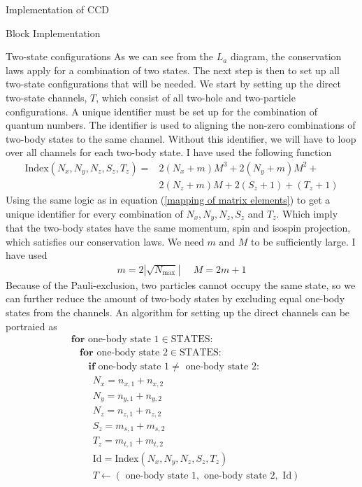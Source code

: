 \documentclass[twoside,english]{uiofysmaster}
\begin{document}
\begin{chapter}{Implementation of CCD}
\begin{section}{Block Implementation}
		\begin{subsection}{Two-state configurations}
			As we can see from the $L_a$ diagram, the conservation laws apply for a combination of two states. The next step is then to set up all two-state configurations that will be needed. We start by setting up the direct two-state channels, $T$, which consist of all two-hole and two-particle configurations. A unique identifier must be set up for the combination of quantum numbers. The identifier is used to aligning the non-zero combinations of two-body states to the same channel. Without this identifier, we will have to loop over all channels for each two-body state. I have used the following function 
			\begin{align}
				\text{Index}(N_x,N_y,N_z,S_z,T_z) = &2(N_x + m)M^3 + 2(N_y+m)M^2 + \\ & 2(N_z+m)M + 2(S_z+1) + (T_z+1)
			\end{align}
			Using the same logic as in equation (\ref{mapping of matrix elements}) to get a unique identifier for every combination of $N_x,N_y,N_z,S_z$ and $T_z$. Which imply that the two-body states have the same momentum, spin and isospin projection, which satisfies our conservation laws. We need $m$ and $M$ to be sufficiently large. I have used
			\begin{align}
				m = 2|\sqrt{N_{\text{max}}}| \:\:\:\:\:\: M = 2m +1
			\end{align}
			Because of the Pauli-exclusion, two particles cannot occupy the same state, so we can further reduce the amount of two-body states by excluding equal one-body states from the channels. An algorithm for setting up the direct channels can be portraied as
			\begin{align*}
				&\mathbf{for } \text{ one-body state 1} \in \text{STATES}: \\
				&\:\:\:\: \mathbf{for } \text{ one-body state 2} \in \text{STATES}: \\
				&\:\:\:\:\:\:\:\: \mathbf{if} \text{ one-body state 1} \neq \text{ one-body state 2}: \\
				&\:\:\:\:\:\:\:\:\:\: N_x = n_{x,1} + n_{x,2} \\
				&\:\:\:\:\:\:\:\:\:\: N_y = n_{y,1} + n_{y,2} \\
				&\:\:\:\:\:\:\:\:\:\: N_z = n_{z,1} + n_{z,2} \\
 				&\:\:\:\:\:\:\:\:\:\: S_z = m_{s,1} + m_{s,2} \\
				&\:\:\:\:\:\:\:\:\:\: T_z = m_{t,1} + m_{t,2} \\
				&\:\:\:\:\:\:\:\:\:\: \text{Id} = \text{Index}(N_x,N_y,N_z,S_z,T_z) \\
				&\:\:\:\:\:\:\:\:\:\: T \leftarrow (\text{ one-body state 1}, \text{ one-body state 2}, \text{ Id})
			\end{align*}


\end{subsection}
\end{section}
\end{chapter}
\end{document}
